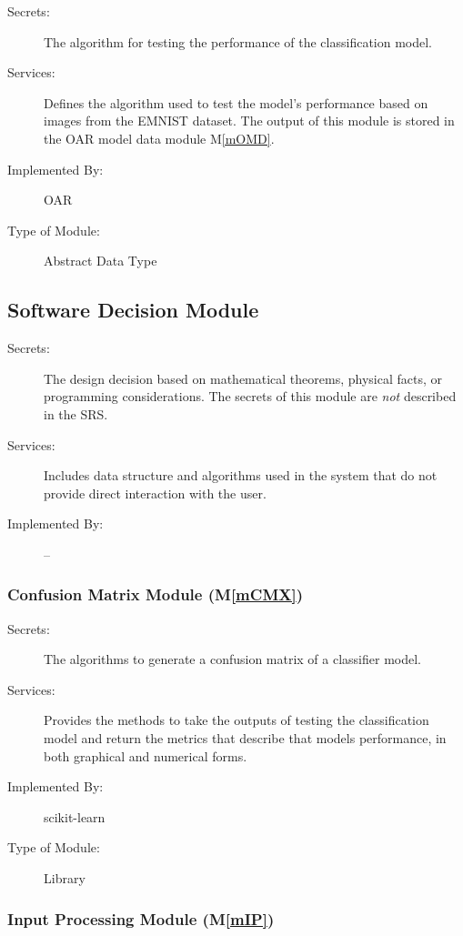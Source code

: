 \documentclass[12pt, titlepage]{article}
\newcommand{\mref}[1]{M\ref{#1}}
\begin{document}
\begin{description}
\item[Secrets:] The algorithm for testing the performance of the classification model.
\item[Services:] Defines the algorithm used to test the model's performance based on images from the EMNIST dataset. The output of this
module is stored in the OAR model data module \mref{mOMD}.
\item[Implemented By:] OAR
\item[Type of Module:] Abstract Data Type
\end{description}


\subsection{Software Decision Module}

\begin{description}
\item[Secrets:] The design decision based on mathematical theorems, physical
  facts, or programming considerations. The secrets of this module are
  \emph{not} described in the SRS.
\item[Services:] Includes data structure and algorithms used in the system that
  do not provide direct interaction with the user. 
\item[Implemented By:] --
\end{description}

\subsubsection{Confusion Matrix Module (\mref{mCMX})}

\begin{description}
\item[Secrets:] The algorithms to generate a confusion matrix of a classifier model.
\item[Services:] Provides the methods to take the outputs of testing the classification model and return the metrics that describe
that models performance, in both graphical and numerical forms.
\item[Implemented By:] scikit-learn
\item[Type of Module:] Library
\end{description}

\subsubsection{Input Processing Module (\mref{mIP})}
\end{document}
